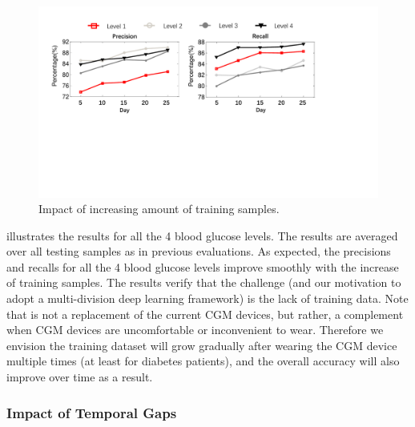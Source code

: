 \begin{figure}[h]
  \centering
  \includegraphics[width=0.8\columnwidth]{./img/performance_under_days1.pdf}
  \caption{Impact of increasing amount of training samples.}
  \label{fig:per_under_train_days}
\end{figure}

 illustrates the results for all the 4 blood glucose levels.
The results are averaged over all testing samples as in previous evaluations.
As expected, the precisions and recalls for all the 4 blood glucose levels improve smoothly with the increase of training samples.
The results verify that the challenge (and our motivation to adopt a multi-division deep learning framework) is the lack of training data.
Note that \sysname is not a replacement of the current CGM devices, but rather, a complement when CGM devices are uncomfortable or inconvenient to wear.
Therefore we envision the training dataset will grow gradually after wearing the CGM device multiple times (at least for diabetes patients), and the overall accuracy will also improve over time as a result.



\subsubsection{Impact of Temporal Gaps}
\label{subsubsec:gaps}

